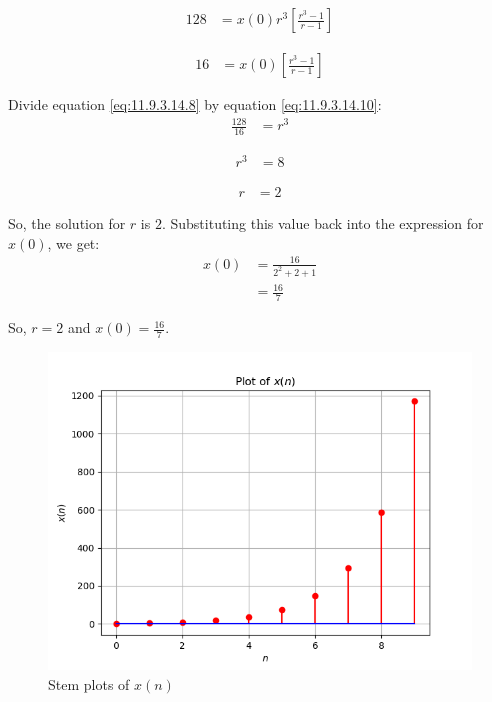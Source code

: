 \documentclass[journal,12pt,onecolumn]{IEEEtran}
\theoremstyle{remark}
\begin{document}
\begin{align}
128 &= x(0)r^3\left[\frac{r^3 - 1}{r - 1}\right] \label{eq:11.9.3.14.9}
\end{align}

\begin{align}
16 &= x(0)\left[\frac{r^3 - 1}{r - 1}\right] \label{eq:11.9.3.14.10}
\end{align}

Divide equation \eqref{eq:11.9.3.14.8} by equation \eqref{eq:11.9.3.14.10}:
\begin{align}
\frac{128}{16} &= r^3 \label{eq:11.9.3.14.11}
\end{align}

\begin{align}
r^3 &= 8 \label{eq:11.9.3.14.12}
\end{align}

\begin{align}
r &= 2 \label{eq:11.9.3.14.13}
\end{align}

So, the solution for $r$ is $2$. Substituting this value back into the expression for $x(0)$, we get:
\begin{align}
x(0) &= \frac{16}{2^2 + 2 + 1} \label{eq:11.9.3.14.14} \\
&= \frac{16}{7} \label{eq:11.9.3.14.16}
\end{align}

So, $r = 2$ and $x(0) = \frac{16}{7}$.
\begin{figure}[h!]
    \centering
    \includegraphics[width=\columnwidth]{ncert-maths/11/9/3/14/figs/plotx.png}
    \caption{Stem plots of $x(n)$}
    \label{fig:11.9.3.14.1}
\end{figure}
\end{document}
